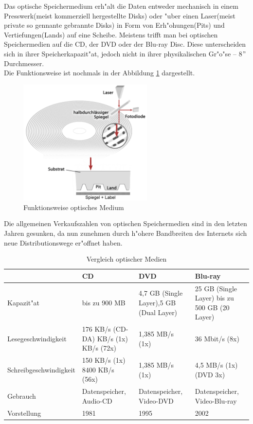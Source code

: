         Das optische Speichermedium erh"alt die Daten entweder mechanisch in einem Presswerk(meist kommerziell hergestellte Disks) oder "uber einen Laser(meist private so gennante \glqq gebrannte\grqq{} Disks) in Form von Erh"ohungen(Pits) und Vertiefungen(Lands) auf eine Scheibe. Meistens trifft man bei optischen Speichermedien auf die CD, der DVD oder der Blu-ray Disc. Diese unterscheiden sich in ihrer Speicherkapazit"at, jedoch nicht in ihrer physikalischen Gr"o"se – 8$"$ Durchmesser.
        \\
		Die Funktionsweise ist nochmals in der Abbildung \ref{fig:cd} dargestellt.
		
		\begin{figure}[ht]
				\centering
				\includegraphics[width=0.6\textwidth]{images/cd} 
				\caption[Funktionsweise optisches Medium \cite{fig:cd}]{Funktionsweise optisches Medium}
				\label{fig:cd}
				\end{figure}
				
        Die allgemeinen Verkaufszahlen von optischen Speichermedien sind in den letzten Jahren gesunken, da nun zunehmen durch h"ohere Bandbreiten des Internets sich neue Distributionswege er"offnet haben.
		

        
{%
\label{ch:Technisch:sec:Optische SpeicherungM}     
\begin{table}[ht]
\small
\begin{tabular}{|p{3.8cm}|p{3.2cm}|p{3cm}|p{3cm}|}
\hline
~ & CD & DVD & Blu-ray \\ \hline
Kapazit"at & bis zu 900 MB & 4,7 GB (Single Layer)\newline 8,5 GB (Dual Layer)  & 25 GB (Single Layer) bis zu 500 GB (20 Layer) \\  \hline
Lesegeschwindigkeit & 176 KB/s (CD-DA)\newline 150 KB/s (1x) \newline 10800 KB/s (72x) & 1,385 MB/s (1x) & 36 Mbit/s (8x) \\ \hline
Schreibgeschwindigkeit & 150 KB/s (1x)  8400 KB/s (56x) & 1,385 MB/s (1x) & 4,5 MB/s (1x) (DVD 3x) \\ \hline
Gebrauch & Datenspeicher, Audio-CD & Datenspeicher, Video-DVD & Datenspeicher, Video-Blu-ray \\ \hline
Vorstellung & 1981 & 1995 & 2002 \\
\hline
\end{tabular}
\caption{Vergleich optischer Medien}
\label{tab:vlgOptMed}
\end{table}
}%


